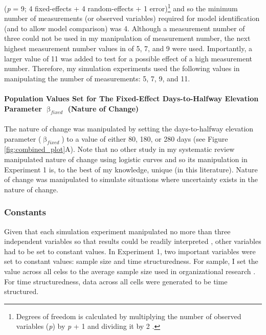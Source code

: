 \documentclass[
12pt, %
twoside,
english]{guelphthesis}
\begin{document}
\noindent (\emph{p} = 9; 4 fixed-effects + 4 random-effects + 1 error)\footnote{Degrees of freedom is calculated by multiplying the number of observed variables (\textit{p}) by \textit{p} + 1 and dividing it by 2 \parencite[$\frac{p [p+1]}{2}$;][]{loehlin2017}.} and so the minimum number of measurements (or observed variables) required for model identification (and to allow model comparison) was 4. Although a measurement number of three could not be used in my manipulation of measurement number, the next highest measurement number values in \textcite{coulombe2016} of 5, 7, and 9 were used. Importantly, a larger value of 11 was added to test for a possible effect of a high measurement number. Therefore, my simulation experiments used the following values in manipulating the number of measurements: 5, 7, 9, and 11.

\hypertarget{population-values-set-for-the-fixed-effect-days-to-halfway-elevation-parameter-upbeta_fixed-nature-of-change}{%
\paragraph{\texorpdfstring{Population Values Set for The Fixed-Effect Days-to-Halfway Elevation Parameter \(\upbeta_{fixed}\) (Nature of Change)}{Population Values Set for The Fixed-Effect Days-to-Halfway Elevation Parameter \textbackslash upbeta\_\{fixed\} (Nature of Change)}}\label{population-values-set-for-the-fixed-effect-days-to-halfway-elevation-parameter-upbeta_fixed-nature-of-change}}

The nature of change was manipulated by setting the days-to-halfway elevation parameter (\(\upbeta_{fixed}\)) to a value of either 80, 180, or 280 days (see Figure \ref{fig:combined_plot}A). Note that no other study in my systematic review manipulated nature of change using logistic curves and so its manipulation in Experiment 1 is, to the best of my knowledge, unique (in this literature). Nature of change was manipulated to simulate situations where uncertainty exists in the nature of change.

\hypertarget{constants}{%
\subsubsection{Constants}\label{constants}}

Given that each simulation experiment manipulated no more than three independent variables so that results could be readily interpreted \autocite{halford2005}, other variables had to be set to constant values. In Experiment 1, two important variables were set to constant values: sample size and time structuredness. For sample, I set the value across all celss to the average sample size used in organizational research \autocite[\emph{n} = 225;][]{bosco2015}. For time structuredness, data across all cells were generated to be time structured.
\end{document}

